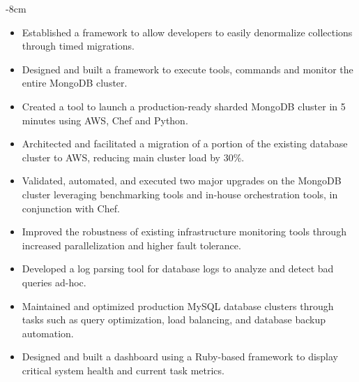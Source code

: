 \documentclass[10pt,a4paper,academicons]{altacv}
\begin{document}

\begin{adjustwidth}{}{-8cm}
\makecvheader
\end{adjustwidth}


\begin{itemize}
\item Established a framework to allow developers to easily denormalize collections through timed migrations.
\item Designed and built a framework to execute tools, commands and monitor the entire MongoDB cluster.
\item Created a tool to launch a production-ready sharded MongoDB cluster in 5
    minutes using AWS, Chef and Python.
\item Architected and facilitated a migration of a portion of the existing
    database cluster to AWS, reducing main cluster load by 30\%. 
\item Validated, automated, and executed two major upgrades on the MongoDB
    cluster leveraging benchmarking tools and in-house orchestration tools, in
        conjunction with Chef.
\item Improved the robustness of existing infrastructure monitoring tools through increased parallelization and higher fault tolerance.
\item Developed a log parsing tool for database logs to analyze and detect bad queries ad-hoc.
\end{itemize}

\divider

\begin{itemize}
\item Maintained and optimized production MySQL database clusters through tasks such as query optimization, load balancing, and database backup automation.
\item Designed and built a dashboard using a Ruby-based framework to display critical system health and current task metrics.
\end{itemize}

\divider
\end{document}
